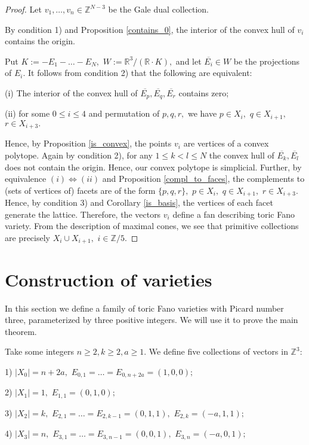 \documentclass[11pt,leqno]{amsart}
\numberwithin{equation}{section}
\def\R{\mathbb{R}}
\def\Z{\mathbb{Z}}
\begin{document}
\begin{proof}Let $v_1,\dots,v_n\in\Z^{N-3}$ be the Gale dual collection.

By condition 1) and Proposition
\ref{contains_0}, the interior of the convex hull of $v_i$ contains the origin.

Put $K:=-E_1-\dots-E_N,$  $W:=\R^3/(\R\cdot K),$ and let $\overline{E_i}\in W$ be the projections of $E_i.$ It follows from
 condition 2) that the following are equivalent:

(i) The interior of the convex hull of $\overline{E_p},\overline{E_q},\overline{E_r}$ contains zero;

(ii) for some $0\leq i\leq 4$ and permutation of $p,q,r,$ we have  $p\in X_i,$ $q\in X_{i+1},$ $r\in X_{i+3}.$

Hence, by Proposition \ref{is_convex}, the points $v_i$ are vertices of a convex polytope. Again by condition 2), for any $1\leq k<l\leq N$ the convex hull of $\overline{E_k},\overline{E_l}$ does not contain the origin. Hence, our convex polytope is simplicial. Further, by equivalence $(i)\Leftrightarrow (ii)$
and Proposition \ref{compl_to_faces}, the complements to (sets of vertices of) facets are of the form $\{p,q,r\},$ $p\in X_i,$ $q\in X_{i+1},$ $r\in X_{i+3}.$
Hence, by condition 3) and Corollary \ref{is_basis}, the vertices of each facet generate the lattice. Therefore,
the vectors $v_i$ define a fan describing toric Fano variety. From the description of maximal cones, we see that primitive collections
are precisely $X_i\cup X_{i+1},$ $i\in \Z/5.$
\end{proof}

\section{Construction of varieties}
\label{construction}

In this section we define a family of toric Fano varieties with Picard number three, parameterized by three positive integers. We will
use it to prove the main theorem.

Take some integers $n\geq 2,k\geq 2,a\geq 1.$ We define five collections of vectors in $\Z^3:$

1) $|X_0|=n+2a,$ $E_{0,1}=\dots=E_{0,n+2a}=(1,0,0);$

2) $|X_1|=1,$ $E_{1,1}=(0,1,0);$

3) $|X_2|=k,$ $E_{2,1}=\dots=E_{2,k-1}=(0,1,1),$ $E_{2,k}=(-a,1,1);$

4) $|X_3|=n,$ $E_{3,1}=\dots=E_{3,n-1}=(0,0,1),$ $E_{3,n}=(-a,0,1);$
\end{document}
